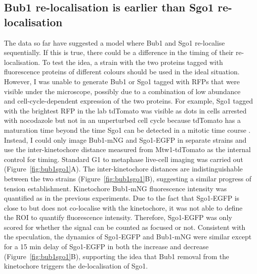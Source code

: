 \subsection{Bub1 re-localisation is earlier than Sgo1 re-localisation}

The data so far have suggested a model where Bub1 and Sgo1 re-localise sequentially. If this is true, there could be a difference in the timing of their re-localisation. To test the idea, a strain with the two proteins tagged with fluorescence proteins of different colours should be used in the ideal situation. However, I was unable to generate Bub1 or Sgo1 tagged with RFPs that were visible under the microscope, possibly due to a combination of low abundance and cell-cycle-dependent expression of the two proteins. For example, Sgo1 tagged with the brightest RFP in the lab tdTomato was visible as dots in cells arrested with nocodazole but not in an unperturbed cell cycle because tdTomato has a maturation time beyond the time Sgo1 can be detected in a mitotic time course \citep{Shaner2004ImprovedProtein, Indjeian2005a}. Instead, I could only image Bub1-mNG and Sgo1-EGFP in separate strains and use the inter-kinetochore distance measured from Mtw1-tdTomato as the internal control for timing. Standard G1 to metaphase live-cell imaging was carried out (Figure~\ref{fig:bub1sgo1}A). The inter-kinetochore distances are indistinguishable between the two strains (Figure~\ref{fig:bub1sgo1}B), suggesting a similar progress of tension establishment. Kinetochore Bub1-mNG fluorescence intensity was quantified as in the previous experiments. Due to the fact that Sgo1-EGFP is close to but does not co-localise with the kinetochore, it was not able to define the ROI to quantify fluorescence intensity. Therefore, Sgo1-EGFP was only scored for whether the signal can be counted as focused or not. Consistent with the speculation, the dynamics of Sgo1-EGFP and Bub1-mNG were similar except for a 15 \si{\minute} delay of Sgo1-EGFP in both the increase and decrease (Figure~\ref{fig:bub1sgo1}B), supporting the idea that Bub1 removal from the kinetochore triggers the de-localisation of Sgo1. 


